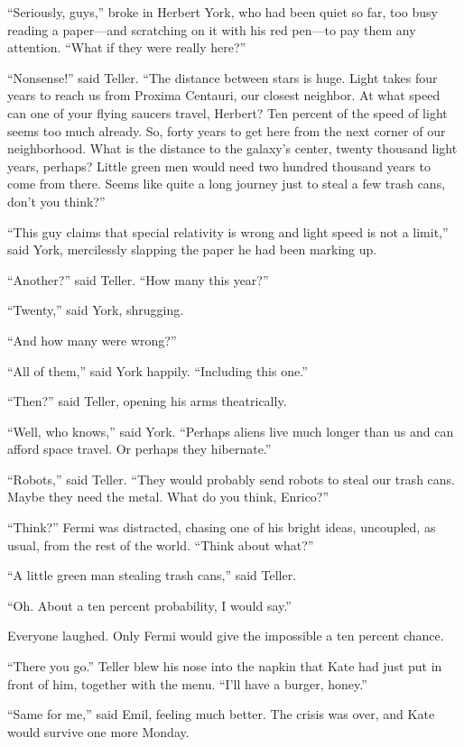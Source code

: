 \documentclass[11pt,a4paper]{article}
\begin{document}
“Seriously, guys,” broke in Herbert York, who had been quiet so far, too busy reading a paper---and scratching on it with his red pen---to pay them any attention. “What if they were really here?”

“Nonsense!” said Teller. “The distance between stars is huge. Light takes four years to reach us from Proxima Centauri, our closest neighbor. At what speed can one of your flying saucers travel, Herbert? Ten percent of the speed of light seems too much already. So, forty years to get here from the next corner of our neighborhood. What is the distance to the galaxy’s center, twenty thousand light years, perhaps? Little green men would need two hundred thousand years to come from there. Seems like quite a long journey just to steal a few trash cans, don’t you think?”

“This guy claims that special relativity is wrong and light speed is not a limit,” said York, mercilessly slapping the paper he had been marking up.

“Another?” said Teller. “How many this year?”

“Twenty,” said York, shrugging.

“And how many were wrong?”

“All of them,” said York happily. “Including this one.”

“Then?” said Teller, opening his arms theatrically.

“Well, who knows,” said York. “Perhaps aliens live much longer than us and can afford space travel. Or perhaps they hibernate.”

“Robots,” said Teller. “They would probably send robots to steal our trash cans. Maybe they need the metal. What do you think, Enrico?”

“Think?” Fermi was distracted, chasing one of his bright ideas, uncoupled, as usual, from the rest of the world. “Think about what?”

“A little green man stealing trash cans,” said Teller.

“Oh. About a ten percent probability, I would say.”

Everyone laughed. Only Fermi would give the impossible a ten percent chance.

“There you go.” Teller blew his nose into the napkin that Kate had just put in front of him, together with the menu. “I’ll have a burger, honey.”

“Same for me,” said Emil, feeling much better. The crisis was over, and Kate would survive one more Monday.
\end{document}
